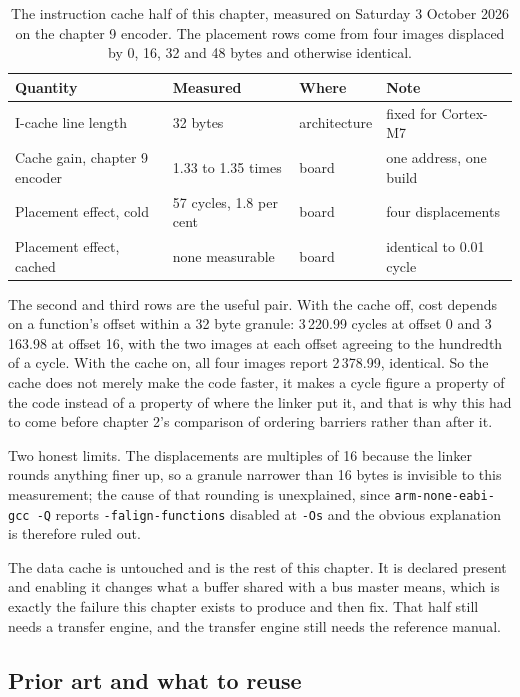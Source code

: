 \begin{table}[H]\centering\small
\begin{tabular}{p{30mm}p{30mm}p{30mm}p{32mm}}
\toprule
Quantity & Measured & Where & Note \\
\midrule
I-cache line length & 32 bytes & architecture & fixed for Cortex-M7 \\
Cache gain, chapter 9 encoder & 1.33 to 1.35 times & board & one address, one build \\
Placement effect, cold & 57 cycles, 1.8 per cent & board & four displacements \\
Placement effect, cached & none measurable & board & identical to 0.01 cycle \\
\bottomrule
\end{tabular}
\caption{The instruction cache half of this chapter, measured on Saturday 3 October 2026 on the chapter 9 encoder. The placement rows come from four images displaced by 0, 16, 32 and 48 bytes and otherwise identical.}
\end{table}

The second and third rows are the useful pair. With the cache off, cost depends on
a function's offset within a 32 byte granule: 3\,220.99 cycles at offset 0 and
3\,163.98 at offset 16, with the two images at each offset agreeing to the
hundredth of a cycle. With the cache on, all four images report 2\,378.99,
identical. So the cache does not merely make the code faster, it makes a cycle
figure a property of the code instead of a property of where the linker put it, and
that is why this had to come before chapter 2's comparison of ordering barriers
rather than after it.

Two honest limits. The displacements are multiples of 16 because the linker rounds
anything finer up, so a granule narrower than 16 bytes is invisible to this
measurement; the cause of that rounding is unexplained, since
\texttt{arm-none-eabi-gcc -Q} reports \texttt{-falign-functions} disabled at
\texttt{-Os} and the obvious explanation is therefore ruled out.

The data cache is untouched and is the rest of this chapter. It is declared present
and enabling it changes what a buffer shared with a bus master means, which is
exactly the failure this chapter exists to produce and then fix. That half still
needs a transfer engine, and the transfer engine still needs the reference manual.

\subsection*{Prior art and what to reuse}

